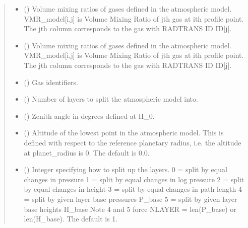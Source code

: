 \documentclass[letterpaper,10pt,english]{sphinxmanual}
\begin{document}
\begin{fulllineitems}
\begin{quote}
\begin{description}
\begin{itemize}
\item {} 
\sphinxAtStartPar
{}\sphinxstyleliteralstrong{\sphinxupquote{(}} () \textendash{} Volume mixing ratios of gases defined in the atmospheric model.
VMR\_model{[}i,j{]} is Volume Mixing Ratio of jth gas at ith profile point.
The jth column corresponds to the gas with RADTRANS ID ID{[}j{]}.

\item {} 
\sphinxAtStartPar
{}\sphinxstyleliteralstrong{\sphinxupquote{)}} () \textendash{} Volume mixing ratios of gases defined in the atmospheric model.
VMR\_model{[}i,j{]} is Volume Mixing Ratio of jth gas at ith profile point.
The jth column corresponds to the gas with RADTRANS ID ID{[}j{]}.

\item {} 
\sphinxAtStartPar
{} () \textendash{} Gas identifiers.

\item {} 
\sphinxAtStartPar
{} () \textendash{} Number of layers to split the atmospheric model into.

\item {} 
\sphinxAtStartPar
{} () \textendash{} Zenith angle in degrees defined at H\_0.

\item {} 
\sphinxAtStartPar
{} (\sphinxstyleliteralemphasis{\sphinxupquote{, }}) \textendash{} Altitude of the lowest point in the atmospheric model.
This is defined with respect to the reference planetary radius, i.e.
the altitude at planet\_radius is 0.
The default is 0.0.

\item {} 
\sphinxAtStartPar
{} (\sphinxstyleliteralemphasis{\sphinxupquote{, }}) \textendash{} Integer specifying how to split up the layers.
0 = split by equal changes in pressure
1 = split by equal changes in log pressure
2 = split by equal changes in height
3 = split by equal changes in path length
4 = split by given layer base pressures P\_base
5 = split by given layer base heights H\_base
Note 4 and 5 force NLAYER = len(P\_base) or len(H\_base).
The default is 1.


\end{itemize}
\end{description}
\end{quote}
\end{fulllineitems}
\end{document}
